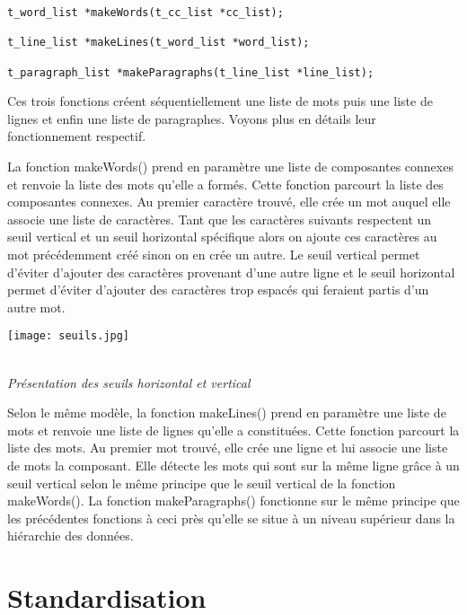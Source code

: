 \documentclass[a4paper,10pt]{report}
\begin{document}
\begin{lstlisting}
t_word_list *makeWords(t_cc_list *cc_list);

t_line_list *makeLines(t_word_list *word_list);

t_paragraph_list *makeParagraphs(t_line_list *line_list);
\end{lstlisting}

Ces trois fonctions créent séquentiellement une liste de mots puis une liste de lignes et
enfin une liste de paragraphes. Voyons plus en détails leur fonctionnement respectif.
   
La fonction makeWords() prend en paramètre une liste de composantes connexes et
renvoie la liste des mots qu'elle a formés. Cette fonction parcourt la liste des composantes
connexes. Au premier caractère trouvé, elle crée un mot auquel elle associe une liste de
caractères. Tant que les caractères suivants respectent un seuil vertical et un seuil
horizontal spécifique alors on ajoute ces caractères au mot précédemment créé sinon on en
crée un autre. Le seuil vertical permet d'éviter d'ajouter des caractères provenant d'une
autre ligne et le seuil horizontal permet d'éviter d'ajouter des caractères trop espacés qui
feraient partis d'un autre mot.

\begin{center}
  \texttt{[image: seuils.jpg]}
  \caption{\\\emph{Pr\'esentation des seuils horizontal et vertical}}
\end{center}

Selon le même modèle, la fonction makeLines() prend en paramètre une liste de mots et
renvoie une liste de lignes qu'elle a constituées. Cette fonction parcourt la liste des mots. Au
premier mot trouvé, elle crée une ligne et lui associe une liste de mots la composant. Elle
détecte les mots qui sont sur la même ligne grâce à un seuil vertical selon le même principe
que le seuil vertical de la fonction makeWords(). La fonction makeParagraphs() fonctionne
sur le même principe que les précédentes fonctions à ceci près qu'elle se situe à un niveau
supérieur dans la hiérarchie des données.



\section{Standardisation}
\end{document}
